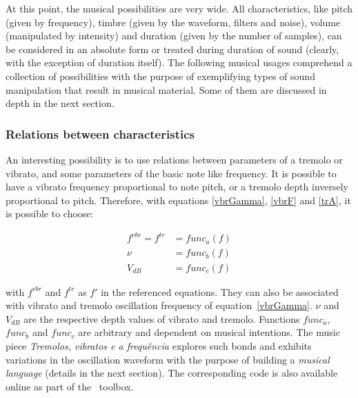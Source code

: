 At this point, the musical possibilities are very wide. All characteristics, like pitch (given by frequency), timbre (given by the waveform, filters and noise), volume (manipulated by intensity) and duration (given by the number of samples), can be considered in an absolute form or treated during duration of sound (clearly, with the exception of duration itself). The following musical usages comprehend a collection of possibilities with the purpose of exemplifying types of sound manipulation that result in musical material. Some of them are discussed in depth in the next section.


\subsubsection{Relations between characteristics}

An interesting possibility is to use relations between parameters of
a tremolo or vibrato, and some parameters of the basic note like frequency. It is possible to have a vibrato frequency proportional
to note pitch, or a tremolo depth inversely proportional to
pitch. Therefore, with equations \ref{vbrGamma}, \ref{vbrF} and \ref{trA}, it is possible to choose:

\begin{equation}\label{eq:vinculos}
\begin{split}
f^{vbr} = f^{tr} & = func_a(f) \\
\nu & = func_b(f) \\
V_{dB} & = func_c(f)
\end{split}
\end{equation}

\noindent with $f^{vbr}$ and $f^{tr}$ as $f'$ in the referenced equations. They can also be associated with vibrato and tremolo oscillation frequency of equation~\ref{vbrGamma}. 
 $\nu$ and $V_{dB}$ are the respective depth values of vibrato and
tremolo. Functions $func_a$, $func_b$ and $func_c$ are arbitrary and dependent on musical intentions. The music piece \emph{Tremolos, vibratos e a
frequência} explores such bonds and exhibits variations in the oscillation waveform with the purpose of building a \emph{musical
language} (details in the next section). The corresponding code is also available online as part of the \massa\ toolbox.

